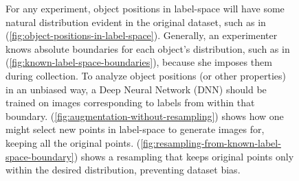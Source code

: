\documentclass[10pt, journal]{IEEEtran}
\begin{document}
\begin{figure}
{    \label{fig:augmentation-without-resampling}
  }
  \caption{For any experiment, object positions in label-space will have some
    natural distribution evident in the original dataset, such as in
    (\ref{fig:object-positions-in-label-space}). Generally, an experimenter
    knows absolute boundaries for each object's distribution, such as in
    (\ref{fig:known-label-space-boundaries}), because she imposes them during
    collection. To analyze object positions (or other properties) in an unbiased
    way, a Deep Neural Network (DNN) should be trained on images corresponding
    to labels from within that
    boundary. (\ref{fig:augmentation-without-resampling}) shows how one might
    select new points in label-space to generate images for, keeping all the
    original points. (\ref{fig:resampling-from-known-label-space-boundary})
    shows a resampling that keeps original points only within the desired
    distribution, preventing dataset bias.}
  \label{fig:label-space}
\end{figure}
\end{document}
